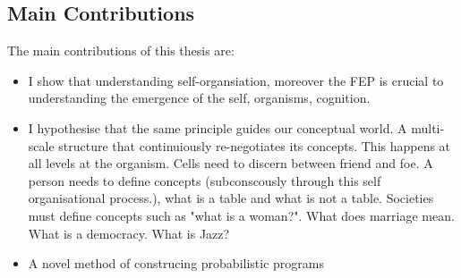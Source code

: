\subsection{Main Contributions}
The main contributions of this thesis are: 
\begin{itemize}
    \item I show that understanding self-organsiation, moreover the FEP is crucial to understanding the emergence of the self, organisms, cognition.
    \item I hypothesise that the same principle guides our conceptual world. A multi-scale structure that continuiously re-negotiates its concepts. This happens at all levels at the organism. Cells need to discern between friend and foe. A person needs to define concepts (subconscously through this self organisational process.), what is a table and what is not a table. Societies must define concepts such as "what is a woman?". What does marriage mean. What is a democracy. What is Jazz?
    \item A novel method of construcing probabilistic programs 
\end{itemize}